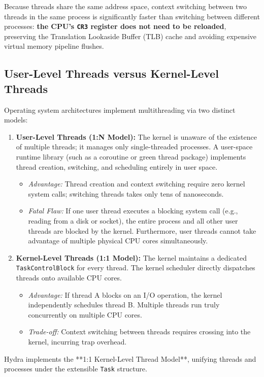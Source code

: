 Because threads share the same address space, context switching between two threads in the same process is significantly faster than switching between different processes: \textbf{the CPU's \texttt{CR3} register does not need to be reloaded}, preserving the Translation Lookaside Buffer (TLB) cache and avoiding expensive virtual memory pipeline flushes.

\subsection{User-Level Threads versus Kernel-Level Threads}
Operating system architectures implement multithreading via two distinct models:
\begin{enumerate}
    \item \textbf{User-Level Threads (1:N Model):} The kernel is unaware of the existence of multiple threads; it manages only single-threaded processes. A user-space runtime library (such as a coroutine or green thread package) implements thread creation, switching, and scheduling entirely in user space.
    \begin{itemize}
        \item \textit{Advantage:} Thread creation and context switching require zero kernel system calls; switching threads takes only tens of nanoseconds.
        \item \textit{Fatal Flaw:} If one user thread executes a blocking system call (e.g., reading from a disk or socket), the entire process and all other user threads are blocked by the kernel. Furthermore, user threads cannot take advantage of multiple physical CPU cores simultaneously.
    \end{itemize}
    \item \textbf{Kernel-Level Threads (1:1 Model):} The kernel maintains a dedicated \texttt{TaskControlBlock} for every thread. The kernel scheduler directly dispatches threads onto available CPU cores.
    \begin{itemize}
        \item \textit{Advantage:} If thread A blocks on an I/O operation, the kernel independently schedules thread B. Multiple threads run truly concurrently on multiple CPU cores.
        \item \textit{Trade-off:} Context switching between threads requires crossing into the kernel, incurring trap overhead.
    \end{itemize}
\end{enumerate}

Hydra implements the **1:1 Kernel-Level Thread Model**, unifying threads and processes under the extensible \texttt{Task} structure.

